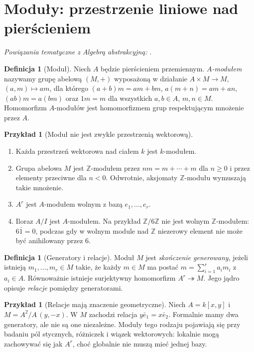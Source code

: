 \documentclass[11pt,a4paper,openany]{report}
\numberwithin{equation}{section}
\theoremstyle{plain}
\theoremstyle{definition}
\newtheorem{definicja}[twierdzenie]{Definicja}
\newtheorem{przyklad}[twierdzenie]{Przykład}
\theoremstyle{remark}
\newcommand{\Z}{\mathbb Z}
\begin{document}
\section{Moduły: przestrzenie liniowe nad pierścieniem}
\label{sec:moduly}

\noindent\emph{Powiązania tematyczne z Algebrą abstrakcyjną:} .


\begin{definicja}[Moduł]
Niech $A$ będzie pierścieniem przemiennym. \emph{$A$-modułem}
nazywamy grupę abelową $(M,+)$ wyposażoną w działanie
$A\times M\to M$, $(a,m)\mapsto am$, dla którego
$(a+b)m=am+bm$, $a(m+n)=am+an$,
$(ab)m=a(bm)$ oraz $1m=m$ dla wszystkich
$a,b\in A$, $m,n\in M$. Homomorfizm $A$-modułów
jest homomorfizmem grup respektującym mnożenie przez $A$.
\end{definicja}

\begin{przyklad}[Moduł nie jest zwykle przestrzenią wektorową]
\begin{enumerate}[label=\alph*)]
\item Każda przestrzeń wektorowa nad ciałem $k$ jest $k$-modułem.
\item Grupa abelowa $M$ jest $\Z$-modułem przez
$nm=m+\cdots+m$ dla $n\ge0$ i przez elementy przeciwne
dla $n<0$. Odwrotnie, aksjomaty $\Z$-modułu wymuszają
takie mnożenie.
\item $A^r$ jest $A$-modułem wolnym z bazą $e_1,\ldots,e_r$.
\item Iloraz $A/I$ jest $A$-modułem. Na przykład
$\Z/6\Z$ nie jest wolnym $\Z$-modułem: $6\bar1=0$,
podczas gdy w wolnym module nad $\Z$ niezerowy element
nie może być anihilowany przez $6$.
\end{enumerate}
\end{przyklad}

\begin{definicja}[Generatory i relacje]
Moduł $M$ jest \emph{skończenie generowany}, jeżeli istnieją
$m_1,\ldots,m_r\in M$ takie, że każdy $m\in M$ ma postać
$m=\sum_{i=1}^r a_i m_i$ z $a_i\in A$.
Równoważnie istnieje surjektywny homomorfizm
$A^r\twoheadrightarrow M$. Jego jądro opisuje
\emph{relacje} pomiędzy generatorami.
\end{definicja}

\begin{przyklad}[Relacje mają znaczenie geometryczne]
Niech $A=k[x,y]$ i $M=A^2/A\,(y,-x)$.
W $M$ zachodzi relacja $y\bar e_1=x\bar e_2$.
Formalnie mamy dwa generatory, ale nie są one niezależne.
Moduły tego rodzaju pojawiają się przy badaniu pól
stycznych, różniczek i wiązek wektorowych: lokalnie
mogą zachowywać się jak $A^r$, choć globalnie
nie muszą mieć jednej bazy.
\end{przyklad}
\end{document}

